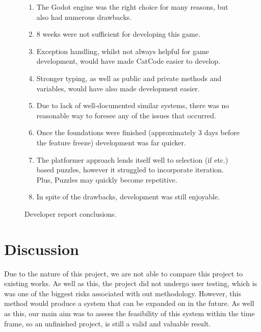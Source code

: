\begin{figure}[H]
    \centering
    \begin{tcolorbox}[boxrule=0.25mm]
        \begin{enumerate}
            \item The Godot engine was the right choice for many reasons, but also had numerous drawbacks.
            \item 8 weeks were not sufficient for developing this game.
            \item Exception handling, whilst not always helpful for game development, would have made CatCode easier to develop.
            \item Stronger typing, as well as public and private methods and variables, would have also made development easier.
            \item Due to lack of well-documented similar systems, there was no reasonable way to foresee any of the issues that occurred.
            \item Once the foundations were finished (approximately 3 days before the feature freeze) development was far quicker.
            \item The platformer approach lends itself well to selection (if etc.) based puzzles, however it struggled to incorporate iteration. Plus, Puzzles may quickly become repetitive.
            \item In spite of the drawbacks, development was still enjoyable.
        \end{enumerate}
    \end{tcolorbox}
    \caption{Developer report conclusions.}
    \label{fig:results/developmentConclusions}
\end{figure}

\section{Discussion}\label{sec:results/discussion}
Due to the nature of this project, we are not able to compare this project to existing works. As well as this, the project did not undergo user testing, which is was one of the biggest risks associated with out methodology. However, this method would produce a system that can be expanded on in the future. As well as this, our main aim was to assess the feasibility of this system within the time frame, so an unfinished project, is still a valid and valuable result.

